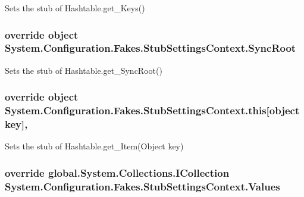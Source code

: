 Sets the stub of Hashtable.\-get\-\_\-\-Keys()

\hypertarget{class_system_1_1_configuration_1_1_fakes_1_1_stub_settings_context_a53ff8369b816cabe1067fffbf0604335}{
\subsubsection[{Sync\-Root}]{\setlength{\rightskip}{0pt plus 5cm}override object System.\-Configuration.\-Fakes.\-Stub\-Settings\-Context.\-Sync\-Root\hspace{0.3cm}{\ttfamily [get]}}}\label{class_system_1_1_configuration_1_1_fakes_1_1_stub_settings_context_a53ff8369b816cabe1067fffbf0604335}


Sets the stub of Hashtable.\-get\-\_\-\-Sync\-Root()

\hypertarget{class_system_1_1_configuration_1_1_fakes_1_1_stub_settings_context_a08169ed16c41703c6ee8e9a2ef7cd2f5}{
\subsubsection[{this[object key]}]{\setlength{\rightskip}{0pt plus 5cm}override object System.\-Configuration.\-Fakes.\-Stub\-Settings\-Context.\-this\mbox{[}object key\mbox{]}\hspace{0.3cm}{\ttfamily [get]}, {\ttfamily [set]}}}\label{class_system_1_1_configuration_1_1_fakes_1_1_stub_settings_context_a08169ed16c41703c6ee8e9a2ef7cd2f5}


Sets the stub of Hashtable.\-get\-\_\-\-Item(\-Object key)

\hypertarget{class_system_1_1_configuration_1_1_fakes_1_1_stub_settings_context_adc4847a1bd092d0a51d7059a08a30ced}{
\subsubsection[{Values}]{\setlength{\rightskip}{0pt plus 5cm}override global.\-System.\-Collections.\-I\-Collection System.\-Configuration.\-Fakes.\-Stub\-Settings\-Context.\-Values\hspace{0.3cm}{\ttfamily [get]}}}\label{class_system_1_1_configuration_1_1_fakes_1_1_stub_settings_context_adc4847a1bd092d0a51d7059a08a30ced}


